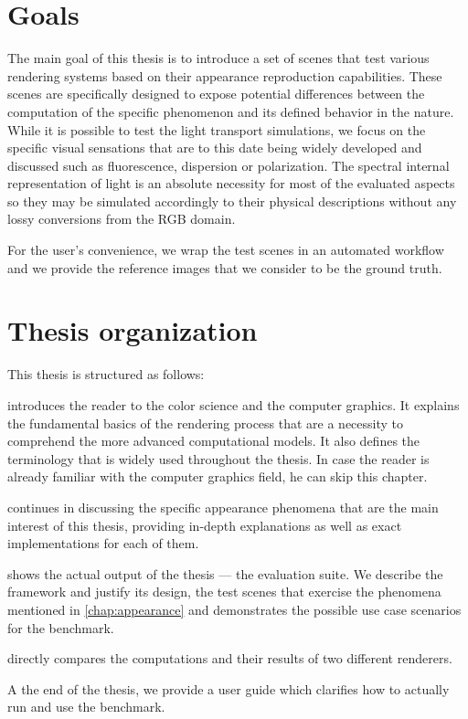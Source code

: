 \section*{Goals}

The main goal of this thesis is to introduce a set of scenes that test various rendering systems based on their appearance reproduction capabilities. These scenes are specifically designed to expose potential differences between the computation of the specific phenomenon and its defined behavior in the nature. While it is possible to test the light transport simulations, we focus on the specific visual sensations that are to this date being widely developed and discussed such as fluorescence, dispersion or polarization. The spectral internal representation of light is an absolute necessity for most of the evaluated aspects so they may be simulated accordingly to their physical descriptions without any lossy conversions from the RGB domain.

For the user's convenience, we wrap the test scenes in an automated workflow and we provide the reference images that we consider to be the ground truth.

\section*{Thesis organization}

This thesis is structured as follows: 

 introduces the reader to the color science and the computer graphics. It explains the fundamental basics of the rendering process that are a necessity to comprehend the more advanced computational models. It also defines the terminology that is widely used throughout the thesis. In case the reader is already familiar with the computer graphics field, he can skip this chapter. 

 continues in discussing the specific appearance phenomena that are the main interest of this thesis, providing in-depth explanations as well as exact implementations for each of them. 

 shows the actual output of the thesis --- the evaluation suite. We describe the framework and justify its design, the test scenes that exercise the phenomena mentioned in \autoref{chap:appearance} and demonstrates the possible use case scenarios for the benchmark. 

 directly compares the computations and their results of two different renderers.

A the end of the thesis, we provide a user guide which clarifies how to actually run and use the benchmark.

